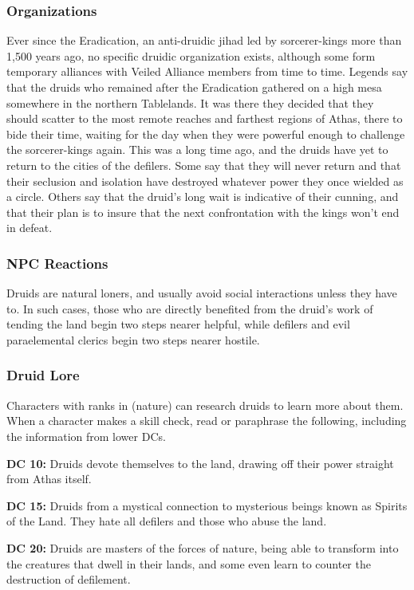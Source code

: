\subsubsection{Organizations}
Ever since the Eradication, an anti-druidic jihad led by sorcerer-kings more than 1,500 years ago, no specific druidic organization exists, although some form temporary alliances with Veiled Alliance members from time to time. Legends say that the druids who remained after the Eradication gathered on a high mesa somewhere in the northern Tablelands. It was there they decided that they should scatter to the most remote reaches and farthest regions of Athas, there to bide their time, waiting for the day when they were powerful enough to challenge the sorcerer-kings again. This was a long time ago, and the druids have yet to return to the cities of the defilers. Some say that they will never return and that their seclusion and isolation have destroyed whatever power they once wielded as a circle. Others say that the druid's long wait is indicative of their cunning, and that their plan is to insure that the next confrontation with the kings won't end in defeat.

\subsubsection{NPC Reactions}
Druids are natural loners, and usually avoid social interactions unless they have to. In such cases, those who are directly benefited from the druid's work of tending the land begin two steps nearer helpful, while defilers and evil paraelemental clerics begin two steps nearer hostile.

\subsubsection{Druid Lore}
Characters with ranks in  (nature) can research druids to learn more about them. When a character makes a skill check, read or paraphrase the following, including the information from lower DCs.

\textbf{DC 10:} Druids devote themselves to the land, drawing off their power straight from Athas itself.

\textbf{DC 15:} Druids from a mystical connection to mysterious beings known as Spirits of the Land. They hate all defilers and those who abuse the land.

\textbf{DC 20:} Druids are masters of the forces of nature, being able to transform into the creatures that dwell in their lands, and some even learn to counter the destruction of defilement.
